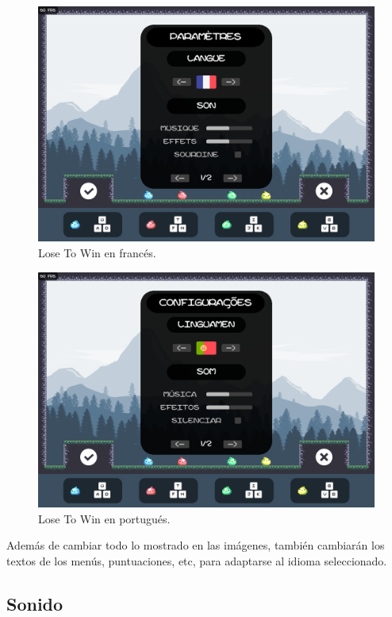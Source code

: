 \documentclass[12pt, spanish]{article}
\begin{document}
\begin{figure}[H]
	\centering
	\includegraphics[width=\textwidth]{"opciones/idiomas/french.png"}
	\caption{Lose To Win en francés.}\label{figure:french}
\end{figure}

\begin{figure}[H]
	\centering
	\includegraphics[width=\textwidth]{"opciones/idiomas/portuguese.png"}
	\caption{Lose To Win en portugués.}\label{figure:portuguese}
\end{figure}


Además de cambiar todo lo mostrado en las imágenes, también cambiarán los textos de los menús, puntuaciones, etc, para adaptarse al idioma seleccionado.

\subsection{Sonido}
\end{document}
